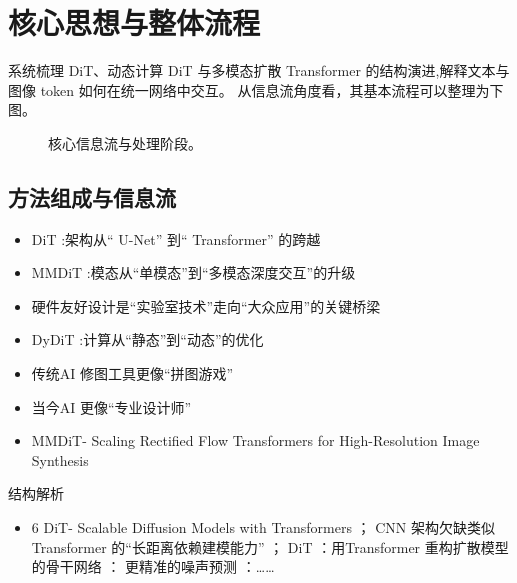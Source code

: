 \documentclass[UTF8,11pt,a4paper]{ctexart}
\begin{document}
\section{核心思想与整体流程}
系统梳理 DiT、动态计算 DiT 与多模态扩散 Transformer 的结构演进,解释文本与图像 token 如何在统一网络中交互。 从信息流角度看，其基本流程可以整理为下图。

\begin{figure}[H]
\centering
{}
\caption{核心信息流与处理阶段。}
\end{figure}

\subsection{方法组成与信息流}
\begin{itemize}
\item DiT :架构从“ U-Net” 到“ Transformer” 的跨越
\item MMDiT :模态从“单模态”到“多模态深度交互”的升级
\item 硬件友好设计是“实验室技术”走向“大众应用”的关键桥梁
\item DyDiT :计算从“静态”到“动态”的优化
\item 传统AI 修图工具更像“拼图游戏”
\item 当今AI 更像“专业设计师”
\item MMDiT- Scaling Rectified Flow Transformers for High-Resolution Image Synthesis
\end{itemize}

\begin{keybox}{结构解析}
\begin{itemize}
\item 6 DiT- Scalable Diffusion Models with Transformers ； CNN 架构欠缺类似Transformer 的“长距离依赖建模能力” ； DiT ：用Transformer 重构扩散模型的骨干网络 ： 更精准的噪声预测 ：……
\end{itemize}
\end{keybox}
\end{document}

